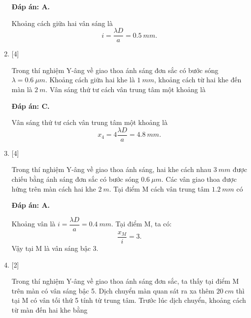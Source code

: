 \begin{enumerate}[label=\bfseries Câu \arabic*:]
	\loigiai
	{		\textbf{Đáp án: A.}
		
		Khoảng cách giữa hai vân sáng là
		$$
		i = \dfrac{\lambda D}{a} = \SI{0,5}{mm}.
		$$
	}
	
	\item {} [4]
	\cauhoi
	{Trong thí nghiệm Y-âng về giao thoa ánh sáng đơn sắc có bước sóng $\lambda = \SI{0,6}{\mu m}$. Khoảng cách giữa hai khe là $\SI{1}{mm}$, khoảng cách từ hai khe đến màn là $\SI{2}{m}$. Vân sáng thứ tư cách vân trung tâm một khoảng là
	}
	
	\loigiai
	{		\textbf{Đáp án: C.}
		
		Vân sáng thứ tư cách vân trung tâm một khoảng là
		$$
		x_{4} = 4 \dfrac{\lambda D}{a} = \SI{4,8}{mm}.
		$$
	}
	
	\item {} [4]
	\cauhoi
	{Trong thí nghiệm Y-âng về giao thoa ánh sáng, hai khe cách nhau $\SI{3}{mm}$ được chiếu bằng ánh sáng đơn sắc có bước sóng $\SI{0,6}{\mu m}$. Các vân giao thoa được hứng trên màn cách hai khe $\SI{2}{m}$. Tại điểm M cách vân trung tâm $\SI{1,2}{mm}$ có
	}
	
	\loigiai
	{		\textbf{Đáp án: A.}
		
		Khoảng vân là $i = \dfrac{\lambda D}{a} = \SI{0,4}{mm}$.
		Tại điểm M, ta có:
		$$
		\dfrac{x_{M}}{i} = 3.
		$$
		Vậy tại M là vân sáng bậc 3.
	}
	
	\item {} [2]
	\cauhoi
	{Trong thí nghiệm Y-âng về giao thoa ánh sáng đơn sắc, ta thấy tại điểm M trên màn có vân sáng bậc 5. Dịch chuyển màn quan sát ra xa thêm $\SI{20}{cm}$ thì tại M có vân tối thứ 5 tính từ trung tâm. Trước lúc dịch chuyển, khoảng cách từ màn đến hai khe bằng
	}
	

\end{enumerate}
